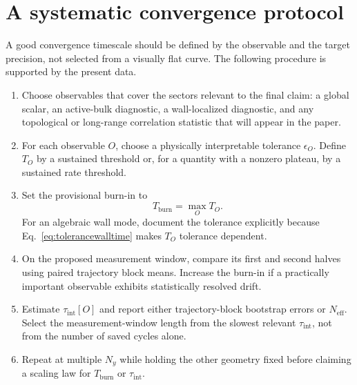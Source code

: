 \documentclass[aps,prb,twocolumn,nofootinbib,superscriptaddress,floatfix]{revtex4-2}
\newcommand{\Tint}{\tau_{\mathrm{int}}}
\begin{document}
\section{A systematic convergence protocol}
\label{sec:protocol}

A good convergence timescale should be defined by the observable and the
target precision, not selected from a visually flat curve.  The following
procedure is supported by the present data.

\begin{enumerate}
  \item Choose observables that cover the sectors relevant to the final claim:
  a global scalar, an active-bulk diagnostic, a wall-localized diagnostic, and
  any topological or long-range correlation statistic that will appear in the
  paper.
  \item For each observable $O$, choose a physically interpretable tolerance
  $\epsilon_O$.  Define $T_O$ by a sustained threshold or, for a quantity with a
  nonzero plateau, by a sustained rate threshold.
  \item Set the provisional burn-in to
  \begin{equation}
   T_{\mathrm{burn}}=\max_O T_O.
   \label{eq:burninmax}
  \end{equation}
  For an algebraic wall mode, document the tolerance explicitly because
  Eq.~\eqref{eq:tolerancewalltime} makes $T_O$ tolerance dependent.
  \item On the proposed measurement window, compare its first and second
  halves using paired trajectory block means.  Increase the burn-in if a
  practically important observable exhibits statistically resolved drift.
  \item Estimate $\Tint[O]$ and report either trajectory-block bootstrap
  errors or $N_{\mathrm{eff}}$.  Select the measurement-window length from the
  slowest relevant $\Tint$, not from the number of saved cycles alone.
  \item Repeat at multiple $N_y$ while holding the other geometry fixed before
  claiming a scaling law for $T_{\mathrm{burn}}$ or $\Tint$.
\end{enumerate}
\end{document}
